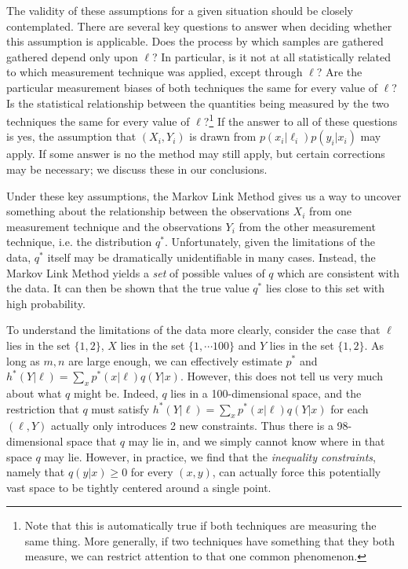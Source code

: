 The validity of these assumptions for a given situation should be closely contemplated.  There are several key questions to answer when deciding whether this assumption is applicable.  Does the process by which samples are gathered gathered depend only upon $\ell$?  In particular, is it not at all statistically related to which measurement technique was  applied, except through $\ell$?  Are the particular measurement biases of both techniques the same for every value of $\ell$?  Is the statistical relationship between the quantities being measured by the two techniques the same for every value of $\ell$?\footnote{Note that this is automatically true if both techniques are measuring the same thing.  More generally, if two techniques have something that they both measure, we can restrict attention to that one common phenomenon.}  If the answer to all of these questions is yes, the assumption that $(X_i,Y_i)$ is drawn from $p(x_i|\ell_i)p(y_i|x_i)$ may apply.  If some answer is no the method may still apply, but certain corrections may be necessary; we discuss these in our conclusions.

Under these key assumptions, the Markov Link Method gives us a way to uncover something about the relationship between the observations $X_i$ from one measurement technique and the observations $Y_i$ from the other measurement technique, i.e. the distribution $q^*$.  Unfortunately, given the limitations of the data, $q^*$ itself may be dramatically unidentifiable in many cases.  Instead, the Markov Link Method yields a \emph{set} of possible values of $q$ which are consistent with the data.  It can then be shown that the true value $q^*$ lies close to this set with high probability.  

To understand the limitations of the data more clearly, consider the case that $\ell$ lies in the set $\{1,2\}$, $X$ lies in the set $\{1,\cdots 100\}$ and $Y$ lies in the set $\{1,2\}$.  As long as $m,n$ are large enough, we can effectively estimate $p^*$ and $h^*(Y|\ell)=\sum_x p^*(x|\ell)q(Y|x)$.  However, this does not tell us very much about what $q$ might be.  Indeed, $q$ lies in a 100-dimensional space, and the restriction that $q$ must satisfy $h^*(Y|\ell)=\sum_x p^*(x|\ell)q(Y|x)$ for each $(\ell,Y)$ actually only introduces 2 new constraints.  Thus there is a 98-dimensional space that $q$ may lie in, and we simply cannot know where in that space $q$ may lie.  However, in practice, we find that the \emph{inequality constraints}, namely that $q(y|x)\geq0$ for every $(x,y)$, can actually force this potentially vast space to be tightly centered around a single point.  

